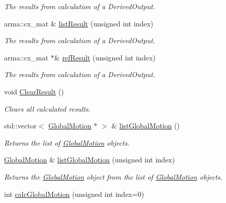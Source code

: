 \begin{DoxyCompactItemize}
\begin{DoxyCompactList}\small\item\em The results from calculation of a Derived\-Output. \end{DoxyCompactList}\item 
arma\-::cx\-\_\-mat \& \hyperlink{classosea_1_1ofreq_1_1_outputs_body_a3e8a0cf3a1289b7d72e38f1cda4cbb03}{list\-Result} (unsigned int index)
\begin{DoxyCompactList}\small\item\em The results from calculation of a Derived\-Output. \end{DoxyCompactList}\item 
arma\-::cx\-\_\-mat $\ast$\& \hyperlink{classosea_1_1ofreq_1_1_outputs_body_aedcd200c75fd6076b35f8683aa89c129}{ref\-Result} (unsigned int index)
\begin{DoxyCompactList}\small\item\em The results from calculation of a Derived\-Output. \end{DoxyCompactList}\item 
void \hyperlink{classosea_1_1ofreq_1_1_outputs_body_adf79e0890716bf481699c2f043934478}{Clear\-Result} ()
\begin{DoxyCompactList}\small\item\em Clears all calculated results. \end{DoxyCompactList}\item 
std\-::vector$<$ \hyperlink{classosea_1_1ofreq_1_1_global_motion}{Global\-Motion} $\ast$ $>$ \& \hyperlink{classosea_1_1ofreq_1_1_outputs_body_a517f818c77bac914ade0c345187e852c}{list\-Global\-Motion} ()
\begin{DoxyCompactList}\small\item\em Returns the list of \hyperlink{classosea_1_1ofreq_1_1_global_motion}{Global\-Motion} objects. \end{DoxyCompactList}\item 
\hyperlink{classosea_1_1ofreq_1_1_global_motion}{Global\-Motion} \& \hyperlink{classosea_1_1ofreq_1_1_outputs_body_a663088b51a3645982f5cc2111a72563a}{list\-Global\-Motion} (unsigned int index)
\begin{DoxyCompactList}\small\item\em Returns the \hyperlink{classosea_1_1ofreq_1_1_global_motion}{Global\-Motion} object from the list of \hyperlink{classosea_1_1ofreq_1_1_global_motion}{Global\-Motion} objects. \end{DoxyCompactList}\item 
int \hyperlink{classosea_1_1ofreq_1_1_outputs_body_a4d34ba129bf256740731225b11c579bf}{calc\-Global\-Motion} (unsigned int index=0)

\end{DoxyCompactItemize}
